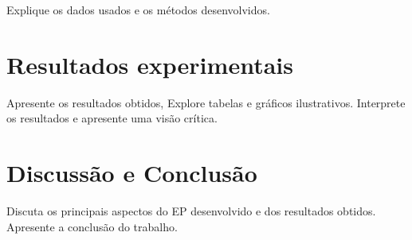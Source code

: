 \documentclass{article}
\begin{document}
Explique os dados usados e os métodos desenvolvidos.

\section{Resultados experimentais}

Apresente os resultados obtidos, Explore tabelas e gráficos ilustrativos. Interprete os resultados e apresente uma visão crítica.

\section{Discussão e Conclusão}

Discuta os principais aspectos do EP desenvolvido e dos resultados obtidos. Apresente a conclusão do trabalho.
\end{document}
